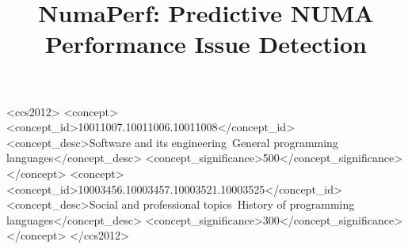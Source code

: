 \documentclass[sigplan,10pt,review,anonymous]{acmart}\settopmatter{printfolios=true,printccs=false,printacmref=false}
\begin{document}
\title{NumaPerf: Predictive NUMA Performance Issue Detection}
\begin{CCSXML}
<ccs2012>
<concept>
<concept_id>10011007.10011006.10011008</concept_id>
<concept_desc>Software and its engineering~General programming languages</concept_desc>
<concept_significance>500</concept_significance>
</concept>
<concept>
<concept_id>10003456.10003457.10003521.10003525</concept_id>
<concept_desc>Social and professional topics~History of programming languages</concept_desc>
<concept_significance>300</concept_significance>
</concept>
</ccs2012>
\end{CCSXML}




\maketitle







{


%
}
\end{document}

